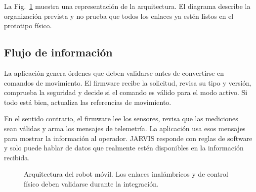 \documentclass[journal]{IEEEtran}
\begin{document}
La Fig.~\ref{fig:arquitectura} muestra una representación de la arquitectura. El diagrama describe la organización prevista y no prueba que todos los enlaces ya estén listos en el prototipo físico.

\subsection{Flujo de información}

La aplicación genera órdenes que deben validarse antes de convertirse en comandos de movimiento. El firmware recibe la solicitud, revisa su tipo y versión, comprueba la seguridad y decide si el comando es válido para el modo activo. Si todo está bien, actualiza las referencias de movimiento.

En el sentido contrario, el firmware lee los sensores, revisa que las mediciones sean válidas y arma los mensajes de telemetría. La aplicación usa esos mensajes para mostrar la información al operador. JARVIS responde con reglas de software y solo puede hablar de datos que realmente estén disponibles en la información recibida.

\begin{figure}[H]
\centering
{}
\caption{Arquitectura del robot móvil. Los enlaces inalámbricos y de control físico deben validarse durante la integración.}
\label{fig:arquitectura}
\end{figure}
\end{document}
